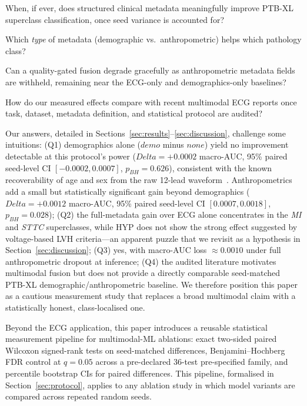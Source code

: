 \documentclass[mathematics,article,submit,pdftex]{Definitions/mdpi}
\def\texttt#1{#1}%
\def\mathrm#1{#1}%
\def\Delta{Delta }%
\begin{document}
\begin{description}[leftmargin=1.5em, style=sameline, font=\bfseries]
\item[Q1.] When, if ever, does structured clinical metadata meaningfully improve PTB-XL superclass classification, once seed variance is accounted for?
\item[Q2.] Which \emph{type} of metadata (demographic vs.\ anthropometric) helps which pathology class?
\item[Q3.] Can a quality-gated fusion degrade gracefully as anthropometric metadata fields are withheld, remaining near the ECG-only and demographics-only baselines?
\item[Q4.] How do our measured effects compare with recent multimodal ECG reports once task, dataset, metadata definition, and statistical protocol are audited?
\end{description}

Our answers, detailed in Sections~\ref{sec:results}--\ref{sec:discussion}, challenge some intuitions: (Q1) demographics alone ($\texttt{demo}$ minus $\texttt{none}$) yield no improvement detectable at this protocol's power ($\Delta{=}{+}0.0002$ macro-AUC, 95\% paired seed-level CI $[-0.0002, 0.0007]$, $p_{\mathrm{BH}}{=}0.626$), consistent with the known recoverability of age and sex from the raw 12-lead waveform~\cite{Attia2019AgeSex}. Anthropometrics add a small but statistically significant gain beyond demographics ($\Delta{=}{+}0.0012$ macro-AUC, 95\% paired seed-level CI $[0.0007, 0.0018]$, $p_{\mathrm{BH}}{=}0.028$); (Q2) the full-metadata gain over ECG alone concentrates in the \emph{MI} and \emph{STTC} superclasses, while HYP does not show the strong effect suggested by voltage-based LVH criteria---an apparent puzzle that we revisit as a hypothesis in Section~\ref{sec:discussion}; (Q3) yes, with macro-AUC loss $\approx 0.0010$ under full anthropometric dropout at inference; (Q4) the audited literature motivates multimodal fusion but does not provide a directly comparable seed-matched PTB-XL demographic/anthropometric baseline. We therefore position this paper as a cautious measurement study that replaces a broad multimodal claim with a statistically honest, class-localised one.

Beyond the ECG application, this paper introduces a reusable statistical measurement pipeline for multimodal-ML ablations: exact two-sided paired Wilcoxon signed-rank tests on seed-matched differences, Benjamini--Hochberg FDR control at $q{=}0.05$ across a pre-declared 36-test pre-specified family, and percentile bootstrap CIs for paired differences. This pipeline, formalised in Section~\ref{sec:protocol}, applies to any ablation study in which model variants are compared across repeated random seeds.
\end{document}
